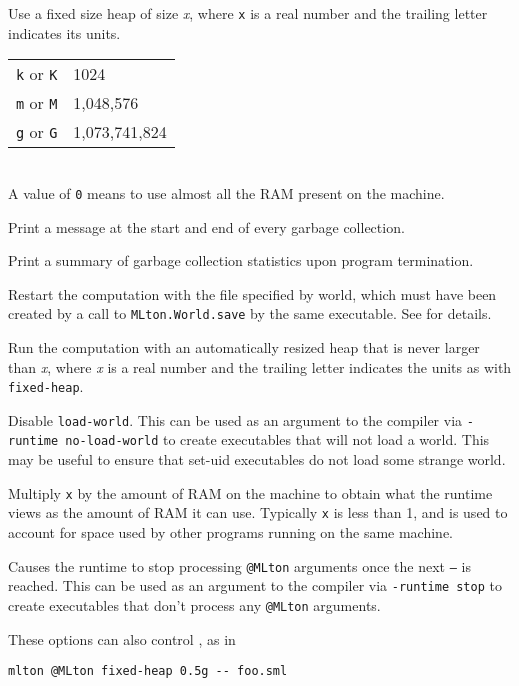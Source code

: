 \begin{description}
Use a fixed size heap of size {\it x}, where {\tt x} is a real number
and the trailing letter indicates its units.\\
\hspace*{0.5in}
\begin{tabular}{l|l}
\hline
{\tt k} or {\tt K} & 1024 \\
{\tt m} or {\tt M} & 1,048,576 \\
{\tt g} or {\tt G} & 1,073,741,824
\end{tabular}\\
A value of {\tt 0} means to use almost all the RAM present on the
machine.

Print a message at the start and end of every garbage collection.

Print a summary of garbage collection statistics upon program
termination.

Restart the computation with the file specified by world, which must
have been created by a call to {\tt MLton.World.save} by the same
executable.  See  for details.

Run the computation with an automatically resized heap that is never
larger than {\it x}, where {\it x} is a real number and the trailing
letter indicates the units as with {\tt fixed-heap}.

Disable {\tt load-world}.  This can be used as an argument to the
compiler via {\tt -runtime no-load-world} to create executables that
will not load a world.  This may be useful to ensure that set-uid
executables do not load some strange world.

Multiply {\tt x} by the amount of RAM on the machine to obtain what
the runtime views as the amount of RAM it can use.  Typically {\tt x}
is less than 1, and is used to account for space used by other
programs running on the same machine.

Causes the runtime to stop processing {\tt @MLton} arguments once the
next {\tt --} is reached.  This can be used as an argument to the
compiler via {\tt -runtime stop} to create executables that don't
process any {\tt @MLton} arguments.
\end{description}
These options can also control {\mlton}, as in
\begin{verbatim}
mlton @MLton fixed-heap 0.5g -- foo.sml
\end{verbatim}
